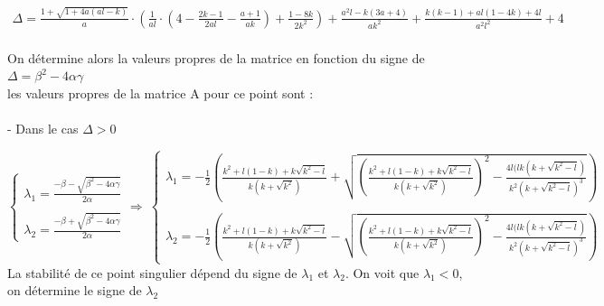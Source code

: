 \documentclass{article}
\begin{document}
\begin{equation}
    \tag{ \Delta }
    \begin{array}{l}
       \Delta = \frac{1 + \sqrt{1 + 4a(al -k)}}{a} \cdot \left( \frac{1}{al} \cdot \left( 4 - \frac{2k-1}{2al} - \frac{a+1}{ak} \right) + \frac{1-8k}{2k^2} \right) + \frac{a^2 l - k (3a+4)}{ak^2} + \frac{k(k-1) + al(1-4k) + 4l}{a^2 l^2} + 4 \\
    \end{array}
    \label{pt6:delta}
\end{equation}


On détermine alors la valeurs propres de la matrice en fonction du signe de $\Delta = \beta^{2} - 4\alpha \gamma$ \\ les valeurs propres de la matrice A pour ce point sont : \\\\
\noindent
- Dans le cas $\Delta > 0$

\begin{equation*}
    \left \{
    \begin{array}{l}
        \lambda_{1} = \frac{- \beta - \sqrt{\beta^{2} - 4 \alpha \gamma}}{2\alpha}\\\\
        \lambda_{2} = \frac{- \beta + \sqrt{\beta^{2} - 4 \alpha \gamma}}{2\alpha} 
    \end{array}
    \right.
    \Rightarrow\ 
    \left \{
    \begin{array}{l}
        \lambda_{1} = -\frac{1}{2} \left(   \frac{k^{2} + l(1-k) + k \sqrt{k^{2} - l}}{k(k + \sqrt{k^{2} })}  + \sqrt{ ( \frac{k^{2} + l(1-k) + k \sqrt{k^{2} - l}}{k(k + \sqrt{k^{2} })} )^{2} -   \frac{4l (lk(k+\sqrt{k^{2}-l})}{k^{2}( k + \sqrt{k^{2} - l})^{3} }    } \right) \\\\
        \lambda_{2} = -\frac{1}{2} \left(   \frac{k^{2} + l(1-k) + k \sqrt{k^{2} - l}}{k(k + \sqrt{k^{2} })}  - \sqrt{ ( \frac{k^{2} + l(1-k) + k \sqrt{k^{2} - l}}{k(k + \sqrt{k^{2} })} )^{2} -   \frac{4l (lk(k+\sqrt{k^{2}-l})}{k^{2}( k + \sqrt{k^{2} - l})^{3} }    } \right)
    \end{array}
    \right.
\end{equation*}
La stabilité de ce point singulier dépend du signe de $\lambda_{1}$ et $\lambda_{2}$. On voit que $\lambda_{1} <0$, on détermine le signe de $\lambda_{2}$
\end{document}
